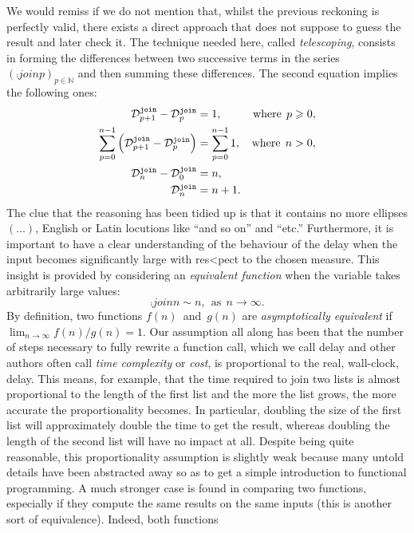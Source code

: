 We would remiss if we do not mention that, whilst the previous
reckoning is perfectly valid, there exists a direct approach that does
not suppose to guess the result and later check it. The technique
needed here, called \emph{telescoping}, consists in forming the
differences between two successive terms in the series
\((\comp{join}{p})_{p \in \mathbb{N}}\) and then summing these
differences. The second equation implies the following ones:
\begin{align}
\comp{join}{p+1} - \comp{join}{p} &= 1, & \text{where} \;\, p
\geqslant 0,\notag\\
\sum_{p=0}^{n-1}{\left(\comp{join}{p+1} - \comp{join}{p}\right)}
  &= \sum_{p=0}^{n-1}{1}, & \text{where} \;\, n > 0,\notag\\
\comp{join}{n} - \comp{join}{0} &= n,\notag\\
\comp{join}{n} &= n + 1.\label{delay:join}
\end{align}
The clue that the reasoning has been tidied up is that it contains no
more ellipses \((\ldots)\), English or Latin locutions like ``and so
on'' and ``etc.'' Furthermore, it is important to have a clear
understanding of the behaviour of the delay when the input becomes
significantly large with res<pect to the chosen measure. This insight
is provided by considering an \emph{equivalent function} when the
variable takes arbitrarily large values:
\[
\comp{join}{n} \mathrel{\sim} n, \,\; \text{as} \;\, n
\rightarrow \infty.
\]
By definition, two functions \(f(n)\)~and~\(g(n)\) are
\emph{asymptotically equivalent} if \(\lim_{n \rightarrow
  \infty}{f(n)/g(n)} = 1\). Our assumption all along has been that the
number of steps necessary to fully rewrite a function call, which we
call delay and other authors often call \emph{time complexity} or
\emph{cost}, is proportional to the real, wall\hyp{}clock, delay. This
means, for example, that the time required to join two lists is almost
proportional to the length of the first list and the more the list
grows, the more accurate the proportionality becomes. In particular,
doubling the size of the first list will approximately double the time
to get the result, whereas doubling the length of the second list will
have no impact at all. Despite being quite reasonable, this
proportionality assumption is slightly weak because many untold
details have been abstracted away so as to get a simple introduction
to functional programming. A much stronger case is found in comparing
two functions, especially if they compute the same results on the same
inputs (this is another sort of equivalence). Indeed, both functions
